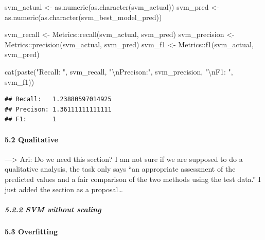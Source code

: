 \documentclass[
]{article}
\newenvironment{Shaded}{\begin{snugshade}}{\end{snugshade}}
\newcommand{\FunctionTok}[1]{\textcolor[rgb]{0.00,0.00,0.00}{#1}}
\newcommand{\NormalTok}[1]{#1}
\newcommand{\OtherTok}[1]{\textcolor[rgb]{0.56,0.35,0.01}{#1}}
\newcommand{\SpecialCharTok}[1]{\textcolor[rgb]{0.00,0.00,0.00}{#1}}
\newcommand{\StringTok}[1]{\textcolor[rgb]{0.31,0.60,0.02}{#1}}
\begin{document}
\begin{Shaded}
\begin{Highlighting}[]
\NormalTok{svm\_actual }\OtherTok{\textless{}{-}} \FunctionTok{as.numeric}\NormalTok{(}\FunctionTok{as.character}\NormalTok{(svm\_actual))}
\NormalTok{svm\_pred }\OtherTok{\textless{}{-}} \FunctionTok{as.numeric}\NormalTok{(}\FunctionTok{as.character}\NormalTok{(svm\_best\_model\_pred))}

\NormalTok{svm\_recall }\OtherTok{\textless{}{-}}\NormalTok{ Metrics}\SpecialCharTok{::}\FunctionTok{recall}\NormalTok{(svm\_actual, svm\_pred)}
\NormalTok{svm\_precision }\OtherTok{\textless{}{-}}\NormalTok{ Metrics}\SpecialCharTok{::}\FunctionTok{precision}\NormalTok{(svm\_actual, svm\_pred)}
\NormalTok{svm\_f1 }\OtherTok{\textless{}{-}}\NormalTok{ Metrics}\SpecialCharTok{::}\FunctionTok{f1}\NormalTok{(svm\_actual, svm\_pred)}

\FunctionTok{cat}\NormalTok{(}\FunctionTok{paste}\NormalTok{(}\StringTok{"Recall:  "}\NormalTok{, svm\_recall, }\StringTok{"}\SpecialCharTok{\textbackslash{}n}\StringTok{Precison:"}\NormalTok{, svm\_precision, }\StringTok{"}\SpecialCharTok{\textbackslash{}n}\StringTok{F1:      "}\NormalTok{, svm\_f1))}
\end{Highlighting}
\end{Shaded}

\begin{verbatim}
## Recall:   1.23880597014925 
## Precison: 1.36111111111111 
## F1:       1
\end{verbatim}

\hypertarget{qualitative}{%
\paragraph{5.2 Qualitative}\label{qualitative}}

---\textgreater{} Ari: Do we need this section? I am not sure if we are
supposed to do a qualitative analysis, the task only says ``an
appropriate assessment of the predicted values and a fair comparison of
the two methods using the test data.'' I just added the section as a
proposal\ldots{}

\hypertarget{svm-without-scaling}{%
\subparagraph{5.2.2 SVM without scaling}\label{svm-without-scaling}}

\hypertarget{overfitting}{%
\paragraph{5.3 Overfitting}\label{overfitting}}
\end{document}
